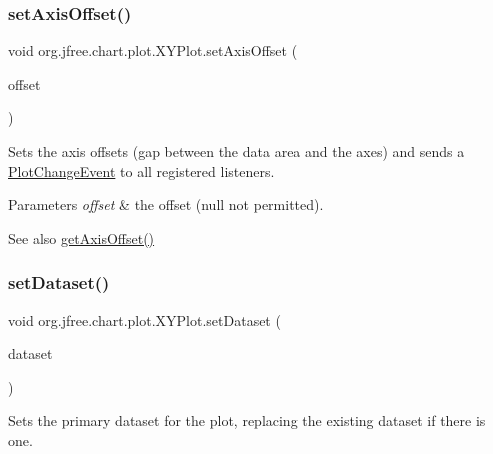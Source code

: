 \subsubsection{\texorpdfstring{set\+Axis\+Offset()}{setAxisOffset()}}
{\footnotesize\ttfamily void org.\+jfree.\+chart.\+plot.\+X\+Y\+Plot.\+set\+Axis\+Offset (\begin{DoxyParamCaption}\item[{Rectangle\+Insets}]{offset }\end{DoxyParamCaption})}

Sets the axis offsets (gap between the data area and the axes) and sends a \mbox{\hyperlink{}{Plot\+Change\+Event}} to all registered listeners.


\begin{DoxyParams}{Parameters}
{\em offset} & the offset ({\ttfamily null} not permitted).\\
\hline
\end{DoxyParams}
\begin{DoxySeeAlso}{See also}
\mbox{\hyperlink{classorg_1_1jfree_1_1chart_1_1plot_1_1_x_y_plot_a26062a5440ddb2cda7513504233dce62}{get\+Axis\+Offset()}} 
\end{DoxySeeAlso}
\mbox{\label{classorg_1_1jfree_1_1chart_1_1plot_1_1_x_y_plot_ab26bacaaabe2637cdca239a6f3fff791}} 
\subsubsection{\texorpdfstring{set\+Dataset()}{setDataset()}\hspace{0.1cm}{\footnotesize\ttfamily [1/2]}}
{\footnotesize\ttfamily void org.\+jfree.\+chart.\+plot.\+X\+Y\+Plot.\+set\+Dataset (\begin{DoxyParamCaption}\item[{\mbox{\hyperlink{interfaceorg_1_1jfree_1_1data_1_1xy_1_1_x_y_dataset}{X\+Y\+Dataset}}}]{dataset }\end{DoxyParamCaption})}

Sets the primary dataset for the plot, replacing the existing dataset if there is one.


